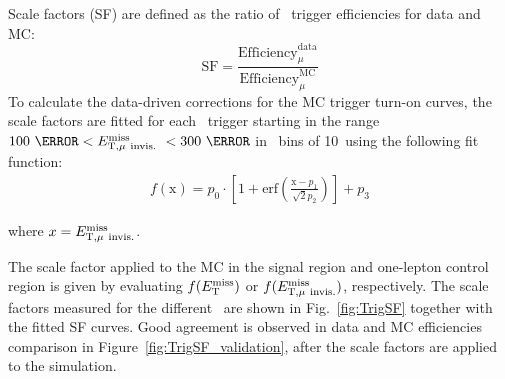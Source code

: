 \par Scale factors (SF) are defined as the ratio of \MET~trigger efficiencies for data and MC:
\begin{equation}
\label{eq:dataMCsf}
\text{SF} = \frac{\text{Efficiency}^{\text{data}}_{\mu}}{\text{Efficiency}^{\text{MC}}_{\mu}}
\end{equation}
To calculate the data-driven corrections for the MC trigger turn-on curves, the scale factors are fitted for each \MET~trigger starting in the range $100~\GeV < \METnomu~< 300~\GeV$ in \MET~bins of 10~\GeV using the following fit function:
\begin{eqnarray}
\label{eq:dataMCsf_fit}
f\left(\text{x}\right) = p_0 \cdot \left[1 + \text{erf}\left(\frac{\text{x} - p_{1}}{\sqrt{2}p_{2}}\right)\right] + p_3
\end{eqnarray}

where $x = E_{\mathrm{T, \mu~invis.}}^{\mathrm{miss}}$.
\par The scale factor applied to the MC in the signal region and one-lepton control region is given by evaluating $f(E_{\mathrm{T}}^{\mathrm{miss}})$ or $f(E_{\mathrm{T, \mu~invis.}}^{\mathrm{miss}})$,
 respectively. The scale factors measured for the different \MET~are shown in Fig.~\ref{fig:TrigSF} together with the fitted SF curves.
 Good agreement is observed in data and MC efficiencies comparison in Figure~\ref{fig:TrigSF_validation}, after the scale factors are applied to the simulation.


